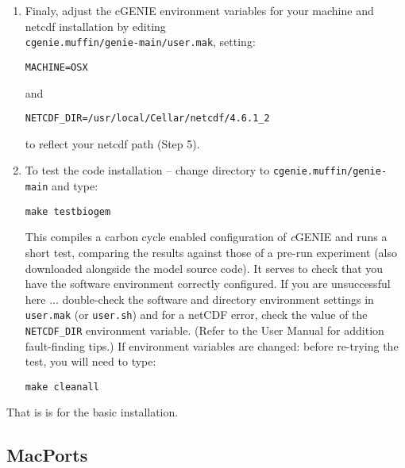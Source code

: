 \documentclass[11pt,fleqn]{book} %
\begin{document}
\begin{enumerate}
\item Finaly, adjust the cGENIE environment variables for your machine and netcdf installation by editing
\\\texttt{cgenie.muffin/genie-main/user.mak}, setting:
\vspace{-5pt}\begin{verbatim}
MACHINE=OSX
\end{verbatim}\vspace{-5pt}
and
\vspace{-5pt}\begin{verbatim}
NETCDF_DIR=/usr/local/Cellar/netcdf/4.6.1_2
\end{verbatim} \vspace{-5pt}
to reflect your netcdf path (Step 5).

\item To test the code installation -- change directory to \texttt{cgenie.muffin/genie-main} and type:
\vspace{-5pt}\begin{verbatim}
make testbiogem
\end{verbatim}\vspace{-5pt}
This compiles a carbon cycle enabled configuration of \textit{c}GENIE and runs a short test, comparing the results against those of a pre-run experiment (also downloaded alongside the model source code). It serves to check that you have the software environment correctly configured. If you are unsuccessful here ... double-check the software and directory environment settings in \texttt{user.mak} (or \texttt{user.sh}) and for a netCDF error, check the value of the \texttt{NETCDF\_DIR} environment variable. (Refer to the User Manual for addition fault-finding tips.) If environment variables are changed: before re-trying the test, you will need to type:
\vspace{-5pt}\begin{verbatim}
make cleanall
\end{verbatim}\vspace{-5pt}

\end{enumerate}

\noindent That is is for the basic installation.

%
\subsection*{MacPorts}\label{how-to-macports}
\end{document}

